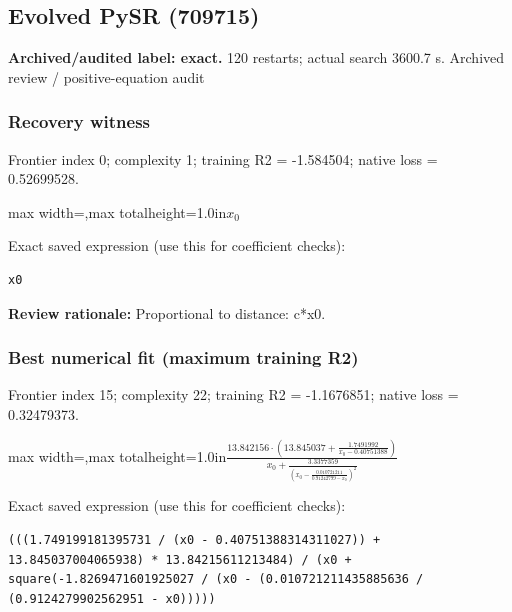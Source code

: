 \documentclass[10pt,letterpaper,landscape]{article}
\begin{document}
\begin{minipage}[t]{0.485\textwidth}
\subsection*{Evolved PySR (709715)}
\textbf{Archived/audited label: exact.} 120 restarts; actual search 3600.7 s.
{\small Archived review / positive-equation audit}
\subsubsection*{Recovery witness}
Frontier index 0; complexity 1; training R2 = -1.584504; native loss = 0.52699528.
\begin{center}\begin{adjustbox}{max width=\linewidth,max totalheight=1.0in}$\displaystyle x_{0}$\end{adjustbox}\end{center}
{\scriptsize Exact saved expression (use this for coefficient checks):}
\begin{lstlisting}
x0
\end{lstlisting}
{\small\textbf{Review rationale:} Proportional to distance: c*x0.}
\subsubsection*{Best numerical fit (maximum training R2)}
Frontier index 15; complexity 22; training R2 = -1.1676851; native loss = 0.32479373.
\begin{center}\begin{adjustbox}{max width=\linewidth,max totalheight=1.0in}$\displaystyle \frac{13.842156 \cdot \left(13.845037 + \frac{1.7491992}{x_{0} - 0.40751388}\right)}{x_{0} + \frac{3.3377359}{\left(x_{0} - \frac{0.010721211}{0.91242799 - x_{0}}\right)^{2}}}$\end{adjustbox}\end{center}
{\scriptsize Exact saved expression (use this for coefficient checks):}
\begin{lstlisting}
(((1.749199181395731 / (x0 - 0.40751388314311027)) + 13.845037004065938) * 13.84215611213484) / (x0 + square(-1.8269471601925027 / (x0 - (0.010721211435885636 / (0.9124279902562951 - x0)))))
\end{lstlisting}
\end{minipage}
\clearpage{}\label{hubble-10004}
\end{document}
